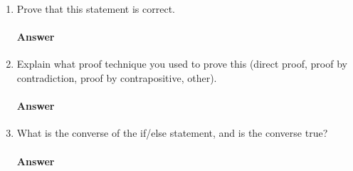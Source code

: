\begin{enumerate}
    \item Prove that this statement is correct.
        \paragraph{Answer}
        \todo{}

    \item Explain what proof technique you used to prove this (direct proof,
        proof by contradiction, proof by contrapositive, other).
        \paragraph{Answer}
        \todo{}

    \item What is the converse of the if/else statement, and is the converse true?
        \paragraph{Answer}
        \todo{}
\end{enumerate}
